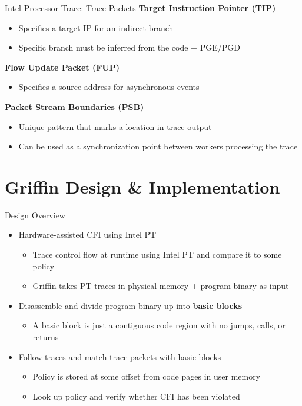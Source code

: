 \documentclass[12pt, dvipsnames, aspectratio=169]{beamer}
\begin{document}
\begin{frame}[c]{Intel Processor Trace: Trace Packets}{}
{\bf Target Instruction Pointer (TIP)}
\begin{itemize}
  \item Specifies a target IP for an indirect branch
  \item Specific branch must be inferred from the code + PGE/PGD
\end{itemize}

\vfill
{\bf Flow Update Packet (FUP)}
\begin{itemize}
  \item Specifies a source address for asynchronous events
\end{itemize}

\vfill
{\bf Packet Stream Boundaries (PSB)}
\begin{itemize}
  \item Unique pattern that marks a location in trace output
  \item Can be used as a synchronization point between workers processing the trace
\end{itemize}
\end{frame}

\section{Griffin Design \& Implementation}

\begin{frame}[c]{Design Overview}{}
  \begin{itemize}
    \item Hardware-assisted CFI using Intel PT
    \begin{itemize}
      \item Trace control flow at runtime using Intel PT and compare it to some policy
      \item Griffin takes PT traces in physical memory + program binary as input
    \end{itemize}
  \end{itemize}

  \vfill
  \begin{itemize}
    \item Disassemble and divide program binary up into {\bf basic blocks}
    \begin{itemize}
      \item A basic block is just a contiguous code region with no jumps, calls, or returns
    \end{itemize}
  \end{itemize}

  \vfill
  \begin{itemize}
    \item Follow traces and match trace packets with basic blocks
    \begin{itemize}
      \item Policy is stored at some offset from code pages in user memory
      \item Look up policy and verify whether CFI has been violated
    \end{itemize}
  \end{itemize}
\end{frame}
\end{document}
